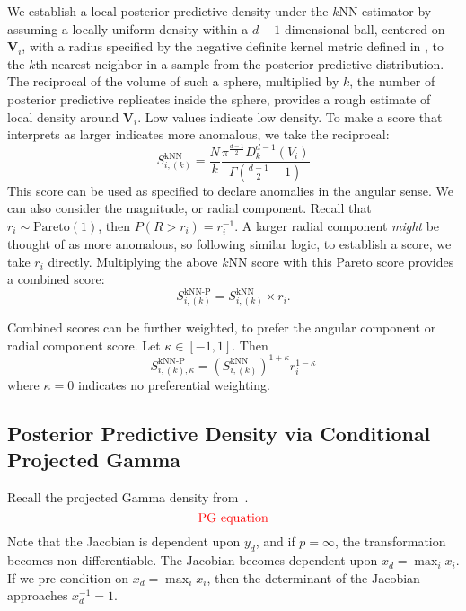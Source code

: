 We establish a local posterior predictive density under the $k$NN estimator by assuming a locally
  uniform density within a $d-1$ dimensional ball, centered on $\bm{V}_i$, with a radius specified by the
  negative definite kernel metric defined in \cite{trubey:pg}, to the $k$th nearest neighbor in a sample
  from the posterior predictive distribution.  The reciprocal of the volume of such a sphere,
  multiplied by $k$, the number of posterior predictive replicates inside the sphere,
  provides a rough estimate of local density around $\bm{V}_i$. Low values indicate low density.
  To make a score that interprets as larger indicates more anomalous, we take the reciprocal:
\begin{equation}
  \label{eqn:ad_knn}
    S_{i,(k)}^{\text{kNN}} = \frac{N}{k}
      \frac{\pi^{\frac{d-1}{2}}D_{k}^{d-1}(V_i)}{\Gamma\left(\frac{d-1}{2} - 1\right)}
\end{equation}
  This score can be used as specified to declare anomalies in the angular sense.  We can also
  consider the magnitude, or radial component.  Recall that $r_i \sim \text{Pareto}(1)$, then
  $P(R > r_i) = r_i^{-1}$.  A larger radial component \emph{might} be thought of as more anomalous,
  so following similar logic, to establish a score, we take $r_i$ directly.
  Multiplying the above $k$NN score with this Pareto score provides a combined score:
\begin{equation}
  \label{eqn:ad_knn_p}
  S_{i,(k)}^{\text{kNN-P}} = S_{i,(k)}^{\text{kNN}}\times r_i.
\end{equation}

Combined scores can be further weighted, to prefer the angular component or radial component score.
Let $\kappa \in [-1,1]$.  Then
\begin{equation}
  S_{i,(k),\kappa}^{\text{kNN-P}} = \left(S_{i,(k)}^{\text{kNN}}\right)^{1 + \kappa}r_i^{1-\kappa}
\end{equation}
where $\kappa = 0$ indicates no preferential weighting.

\subsection{Posterior Predictive Density via Conditional Projected Gamma}

Recall the projected Gamma density from~\cite{trubey:pg}.
  \[
    \text{\textcolor{red}{PG equation}}
  \]
Note that the Jacobian is dependent upon $y_d$, and if $p = \infty$, the transformation becomes
  non-differentiable.  The Jacobian becomes dependent upon $x_d = \max_ix_i$.  If we pre-condition
  on $x_d = \max_ix_i$, then the determinant of the Jacobian approaches $x_d^{-1} = 1$.

